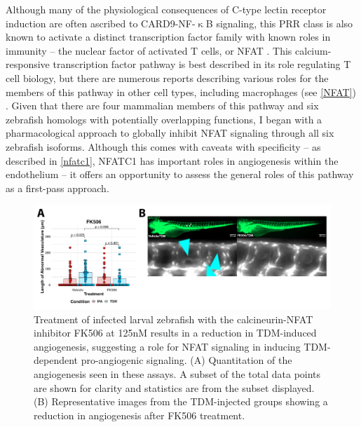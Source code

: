 Although many of the physiological consequences of C\hyp{}type lectin receptor induction are often ascribed to CARD9\hyp{}NF\hyp{}$\upkappa$B signaling, this PRR class is also known to activate a distinct transcription factor family with known roles in immunity -- the nuclear factor of activated T cells, or NFAT \citep{Goodridge2007, Deerhake2021}. This calcium\hyp{}responsive transcription factor pathway is best described in its role regulating T cell biology, but there are numerous reports describing various roles for the members of this pathway in other cell types, including macrophages (see \autoref{NFAT}) \citep{Symes1998, Jones2000, Crabtree2002, Horsley2002, Elloumi2012}. Given that there are four mammalian members of this pathway and six zebrafish homologs with potentially overlapping functions, I began with a pharmacological approach to globally inhibit NFAT signaling through all six zebrafish isoforms. Although this comes with caveats with specificity -- as described in \autoref{nfatc1}, NFATC1 has important roles in angiogenesis within the endothelium -- it offers an opportunity to assess the general roles of this pathway as a first\hyp{}pass approach. 

\begin{figure}
\centering
\includegraphics[width=\textwidth]{images/fk506tdm.pdf}
\caption[FK506 treatment inhibits TDM-mediated angiogenesis]{Treatment of infected larval zebrafish with the calcineurin\hyp{}NFAT inhibitor FK506 at 125nM results in a reduction in TDM\hyp{}induced angiogenesis, suggesting a role for NFAT signaling in inducing TDM\hyp{}dependent pro\hyp{}angiogenic signaling. (A) Quantitation of the angiogenesis seen in these assays. A subset of the total data points are shown for clarity and statistics are from the subset displayed. (B) Representative images from the TDM-injected groups showing a reduction in angiogenesis after FK506 treatment.}
\label{figure:fk506tdm}
\end{figure}

